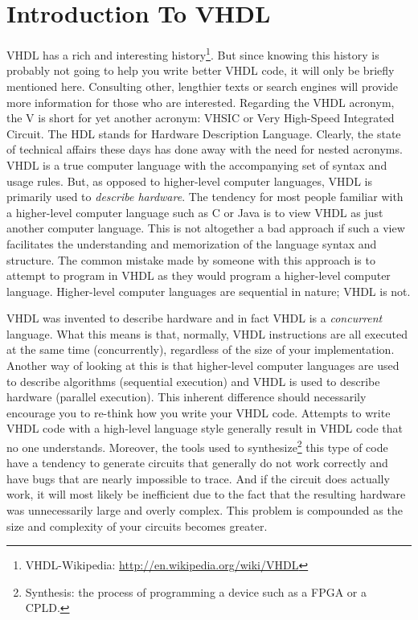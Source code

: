 %
%
%
\chapter{Introduction To VHDL}
VHDL has a rich and interesting history\footnote{VHDL-Wikipedia: {\footnotesize\url{http://en.wikipedia.org/wiki/VHDL}}}. But since knowing this history is probably not going to help you write better VHDL code, it will only be briefly mentioned here. Consulting other, lengthier texts or search engines will provide more information for those who are interested. Regarding the VHDL acronym,  the V is short for yet another acronym: VHSIC or Very High-Speed Integrated Circuit. The HDL stands for Hardware Description Language. Clearly, the state of technical affairs these days has done away with the need for nested acronyms. VHDL is a true computer language with the accompanying set of syntax and usage rules. But, as opposed to higher-level computer languages, VHDL is primarily used  to \textit{describe hardware}. The tendency for most people familiar with a higher-level computer language such as C or Java is to view VHDL as just another computer language. This is not altogether a bad approach if such a view facilitates the understanding and memorization of the language syntax and structure. The common mistake made by someone with this approach is to attempt to program in VHDL as they would program a higher-level computer language. Higher-level computer languages are sequential in nature; VHDL is not. 

VHDL was invented to describe hardware and in fact VHDL is a \textit{concurrent} language. What this means is that, normally, VHDL instructions are all executed at the same time (concurrently), regardless of the size of your implementation. Another way of looking at this is that higher-level computer languages are used to describe algorithms (sequential execution) and VHDL is used to describe hardware (parallel execution). This inherent difference should necessarily encourage you to re-think how you write your VHDL code. Attempts to write VHDL code with a high-level language style generally result in VHDL code that no one understands. Moreover, the tools used to synthesize\footnote{Synthesis: the process of programming a device such as a FPGA or a CPLD.} this type of code have a tendency to generate circuits that generally do not work correctly and have bugs that are nearly impossible to trace. And if the circuit does actually work, it will most likely be inefficient due to the fact that the resulting hardware was unnecessarily large and overly complex. This problem is compounded as the size and complexity of your circuits becomes greater.

